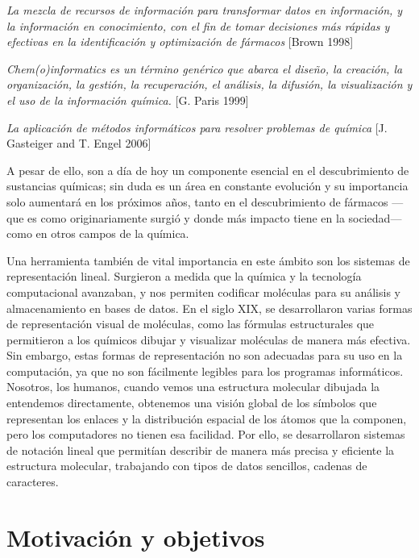\begin{center}
\small
\textit{La mezcla de recursos de información para transformar datos en información, y la información en conocimiento, con el fin de tomar decisiones más rápidas y efectivas en la identificación y optimización de fármacos} [Brown 1998]
\end{center}

\begin{center}
\small
\textit{Chem(o)informatics es un término genérico que abarca el diseño, la creación, la organización, la gestión, la recuperación, el análisis, la difusión, la visualización y el uso de la información química. }[G. Paris 1999]
\end{center}

\begin{center}
\small
\textit{La aplicación de métodos informáticos para resolver problemas de química} [J. Gasteiger and T. Engel 2006]
\end{center}


A pesar de ello, son a día de hoy un componente esencial en el descubrimiento de sustancias químicas; sin duda es un área en constante evolución y su importancia solo aumentará en los próximos años, tanto en el descubrimiento de fármacos —que es como originariamente surgió y donde más impacto tiene en la sociedad— como en otros campos de la química.


Una herramienta también de vital importancia en este ámbito son los sistemas de representación lineal. Surgieron a medida que la química y la tecnología computacional avanzaban, y nos permiten codificar moléculas para su análisis y almacenamiento en bases de datos. En el siglo XIX, se desarrollaron varias formas de representación visual de moléculas, como las fórmulas estructurales que permitieron a los químicos dibujar y visualizar moléculas de manera más efectiva. Sin embargo, estas formas de representación no son adecuadas para su uso en la computación, ya que no son fácilmente legibles para los programas informáticos. Nosotros, los humanos, cuando vemos una estructura molecular dibujada la entendemos directamente, obtenemos una visión global de los símbolos que representan los enlaces y la distribución espacial de los átomos que la componen, pero los computadores no tienen esa facilidad. Por ello, se desarrollaron sistemas de notación lineal que permitían describir de manera más precisa y eficiente la estructura molecular, trabajando con tipos de datos sencillos, cadenas de caracteres.


\section{Motivación y objetivos}

